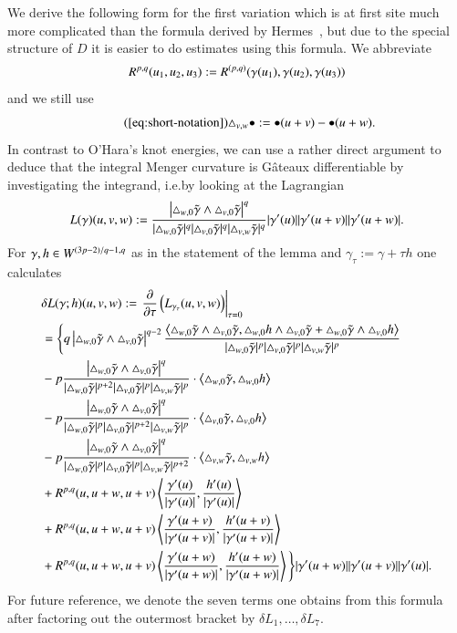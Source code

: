 We derive the following form for the first variation which is at first site 
much more complicated than the formula derived by Hermes~\cite{hermes}, but due to the special structure of $D$
it is easier to do estimates using this formula.
We abbreviate
\[ R^{p,q}(u_{1},u_{2},u_{3}) := \RR(\g(u_{1}),\g(u_{2}),\g(u_{3})) \]
and we still use
\begin{equation}\tag{\ref{eq:short-notation}}
 \T[\bullet]{v}{w}:=\D[\bullet]vw.
\end{equation}
In contrast to O'Hara's knot energies, we can use a rather direct argument to deduce that
the integral Menger curvature is G\^ateaux differentiable by investigating the integrand, i.e.\@ by looking at the 
Lagrangian
\begin{equation*}
 L(\gamma)(u,v,w) := \frac {\left|\T w0 \wedge \T v0 \right|^q}{|\T w0|^{q}|\T v0|^q |\T vw|^q}|\gamma'(u)| |\gamma'(u+v)| |\gamma'(u+w)|.
\end{equation*}
For $\gamma, h \in \W$ as in the statement of the lemma and $\gamma_\tau := \gamma + \tau h$ one calculates
\begin{align*}
 &\delta L(\gamma;h) (u,v,w) :=\left.  \frac {\partial}{\partial \tau }\left(L_{\gamma_\tau}(u,v,w) \right) \right|_{\tau =0} \\
  &= \Bigg\{ q \left| \T w0 \wedge \T v0 \right|^{q-2}  \frac {\sp{\T w0 \wedge \T v0 ,\T[h] w0 \wedge \T v0 + \T w0 \wedge \T[h] v0 }}{|\T w0|^{p}|\T v0|^p |\T vw|^p} \\
  &- p \frac {\left|\T w0 \wedge \T v0 \right|^q}{|\T w0|^{p+2}|\T v0|^p |\T vw|^p}  \cdot  \sp{\T w0, \T[h] w0} \\
  &- p \frac {\left|\T w0 \wedge \T v0 \right|^q}{|\T w0|^{p}|\T v0|^{p+2} |\T vw|^p}  \cdot  \sp{\T v0, \T[h] v0} \\
  &- p \frac {\left|\T w0 \wedge \T v0 \right|^q}{|\T w0|^{p}|\T v0|^p |\T vw|^{p+2}}  \cdot  \sp{\T vw, \T[h] vw} \\
   &+ R^{p,q}(u, u+w, u+v) \sp{\frac {\dg (u)}{\abs{\dg (u)} }, \frac{\dh(u)}{\abs{\dg (u)} }} \\
  &+ R^{p,q}(u, u+w, u+v) \sp{\frac {\dg (u+v)}{\abs{\dg (u+v)} }, \frac{\dh(u+v)}{\abs{\dg (u+v)} }} \\
  &+ R^{p,q}(u, u+w, u+v) \sp{\frac {\dg (u+w)}{\abs{\dg (u+w)} }, \frac{\dh(u+w)}{\abs{\dg (u+w)} }} \Bigg\} |\dg(u+w)| |\dg(u+v)| |\dg(u)|.
\end{align*}
For future reference, we denote the seven terms one obtains from this formula after factoring out the 
outermost bracket by $\delta L_1, \ldots, \delta L_7$.


